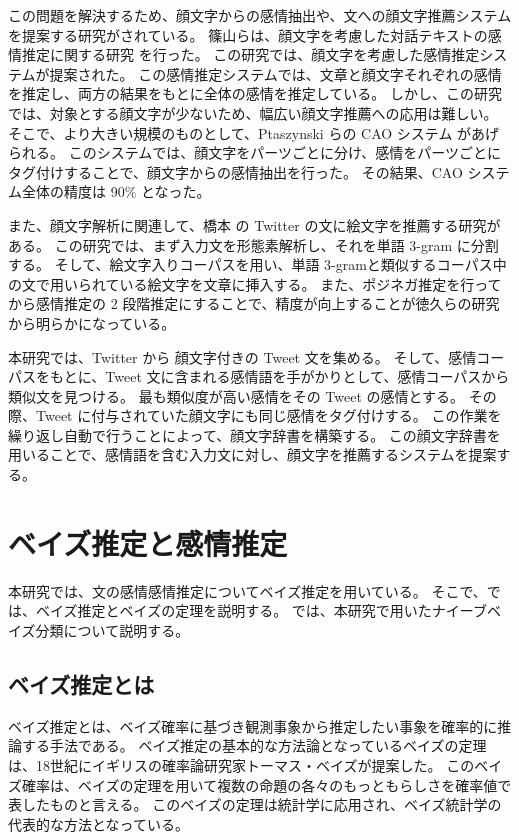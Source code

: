 \documentclass[11pt,a4j]{jsarticle}
\begin{document}
この問題を解決するため、顔文字からの感情抽出や、文への顔文字推薦システムを提案する研究がされている。
篠山らは、顔文字を考慮した対話テキストの感情推定に関する研究  を行った。
この研究では、顔文字を考慮した感情推定システムが提案された。
この感情推定システムでは、文章と顔文字それぞれの感情を推定し、両方の結果をもとに全体の感情を推定している。
しかし、この研究では、対象とする顔文字が少ないため、幅広い顔文字推薦への応用は難しい。
そこで、より大きい規模のものとして、Ptaszynski らの CAO システム があげられる。
このシステムでは、顔文字をパーツごとに分け、感情をパーツごとにタグ付けすることで、顔文字からの感情抽出を行った。
その結果、CAO システム全体の精度は 90\% となった。

また、顔文字解析に関連して、橋本  の Twitter の文に絵文字を推薦する研究がある。
この研究では、まず入力文を形態素解析し、それを単語 3-gram に分割する。
そして、絵文字入りコーパスを用い、単語 3-gramと類似するコーパス中の文で用いられている絵文字を文章に挿入する。
また、ポジネガ推定を行ってから感情推定の 2 段階推定にすることで、精度が向上することが徳久らの研究 から明らかになっている。

本研究では、Twitter から 顔文字付きの Tweet 文を集める。
そして、感情コーパスをもとに、Tweet 文に含まれる感情語を手がかりとして、感情コーパスから類似文を見つける。
最も類似度が高い感情をその Tweet の感情とする。
その際、Tweet に付与されていた顔文字にも同じ感情をタグ付けする。
この作業を繰り返し自動で行うことによって、顔文字辞書を構築する。
この顔文字辞書を用いることで、感情語を含む入力文に対し、顔文字を推薦するシステムを提案する。

\section{ベイズ推定と感情推定}\label{sec:def}
本研究では、文の感情感情推定についてベイズ推定を用いている。
そこで、では、ベイズ推定とベイズの定理を説明する。
では、本研究で用いたナイーブベイズ分類について説明する。

  \subsection{ベイズ推定とは}\label{sec:defbayes}
ベイズ推定とは、ベイズ確率に基づき観測事象から推定したい事象を確率的に推論する手法である。
ベイズ推定の基本的な方法論となっているベイズの定理は、18世紀にイギリスの確率論研究家トーマス・ベイズが提案した。
このベイズ確率は、ベイズの定理を用いて複数の命題の各々のもっともらしさを確率値で表したものと言える。
このベイズの定理は統計学に応用され、ベイズ統計学の代表的な方法となっている。
\end{document}
